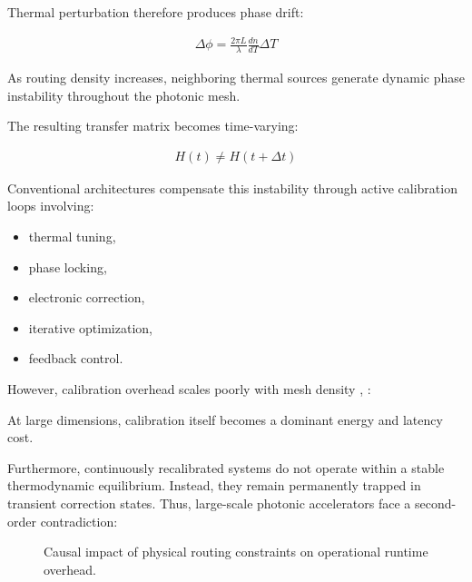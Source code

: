 \documentclass[journal]{IEEEtran}
\begin{document}
Thermal perturbation therefore produces phase drift:

\begin{align}
\Delta \phi = \frac{2\pi L}{\lambda} \frac{dn}{dT} \Delta T
\label{eq:phase_drift}
\end{align}

As routing density increases, neighboring thermal sources generate dynamic phase instability throughout the photonic mesh.

The resulting transfer matrix becomes time-varying:

\begin{align}
H(t) \neq H(t+\Delta t)
\label{eq:time_variation}
\end{align}

Conventional architectures compensate this instability through active calibration loops involving:

\begin{itemize}
\item thermal tuning,
\item phase locking,
\item electronic correction,
\item iterative optimization,
\item feedback control.
\end{itemize}

However, calibration overhead scales poorly with mesh density \cite{Miller2013}, \cite{Hamerly2022}:

\begin{center}
\label{eq:calibration_scaling}
\end{center}

At large dimensions, calibration itself becomes a dominant energy and latency cost.

Furthermore, continuously recalibrated systems do not operate within a stable thermodynamic equilibrium. Instead, they remain permanently trapped in transient correction states. Thus, large-scale photonic accelerators face a second-order contradiction:

\begin{figure}[htbp]
\centering
{}
\caption{Causal impact of physical routing constraints on operational runtime overhead.}
\label{fig:causal_routing}
\end{figure}
\end{document}
